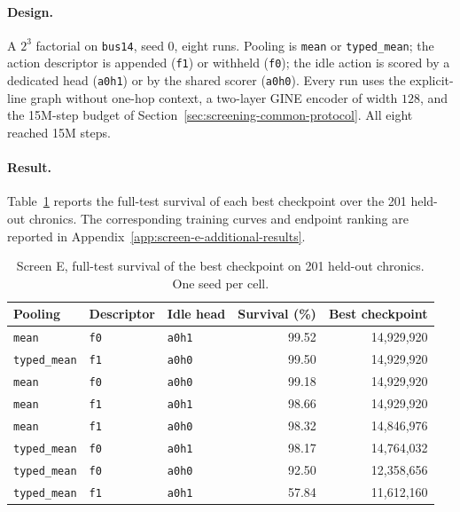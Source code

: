 \paragraph{Design.}
A $2^3$ factorial on \texttt{bus14}, seed $0$, eight runs. Pooling is
\texttt{mean} or \texttt{typed\_mean}; the action descriptor is appended
(\texttt{f1}) or withheld (\texttt{f0}); the idle action is scored by a
dedicated head (\texttt{a0h1}) or by the shared scorer (\texttt{a0h0}). Every
run uses the explicit-line graph without one-hop context, a two-layer GINE
encoder of width $128$, and the 15M-step budget of
Section~\ref{sec:screening-common-protocol}. All eight reached 15M steps.

\paragraph{Result.}
Table~\ref{tab:screen-e-fulltest} reports the full-test survival of each best
checkpoint over the 201 held-out chronics. The corresponding training curves
and endpoint ranking are reported in
Appendix~\ref{app:screen-e-additional-results}.

\begin{table}[H]
  \centering
  \small
  \caption{Screen E, full-test survival of the best checkpoint on 201 held-out
  chronics. One seed per cell.}
  \label{tab:screen-e-fulltest}
  \setlength{\tabcolsep}{6pt}
  \begin{tabular}{lllrr}
    \toprule
    Pooling & Descriptor & Idle head & Survival (\%) & Best checkpoint \\
    \midrule
    \texttt{mean}       & \texttt{f0} & \texttt{a0h1} & 99.52 & 14{,}929{,}920 \\
    \texttt{typed\_mean} & \texttt{f1} & \texttt{a0h0} & 99.50 & 14{,}929{,}920 \\
    \texttt{mean}       & \texttt{f0} & \texttt{a0h0} & 99.18 & 14{,}929{,}920 \\
    \texttt{mean}       & \texttt{f1} & \texttt{a0h1} & 98.66 & 14{,}929{,}920 \\
    \texttt{mean}       & \texttt{f1} & \texttt{a0h0} & 98.32 & 14{,}846{,}976 \\
    \texttt{typed\_mean} & \texttt{f0} & \texttt{a0h1} & 98.17 & 14{,}764{,}032 \\
    \texttt{typed\_mean} & \texttt{f0} & \texttt{a0h0} & 92.50 & 12{,}358{,}656 \\
    \texttt{typed\_mean} & \texttt{f1} & \texttt{a0h1} & 57.84 & 11{,}612{,}160 \\
    \bottomrule
  \end{tabular}
\end{table}

